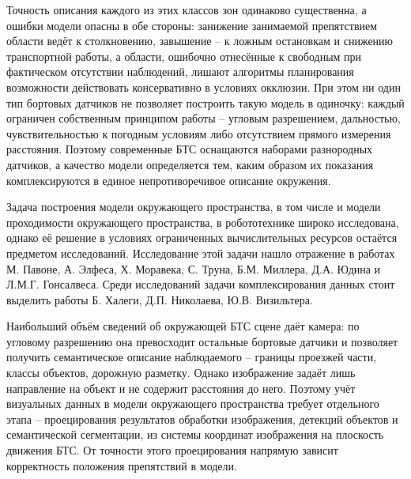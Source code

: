 Точность описания каждого из этих классов зон одинаково существенна, а ошибки модели опасны в обе стороны: занижение занимаемой препятствием области ведёт к столкновению, завышение -- к ложным остановкам и снижению транспортной работы, а области, ошибочно отнесённые к свободным при фактическом отсутствии наблюдений, лишают алгоритмы планирования возможности действовать консервативно в условиях окклюзии. При этом ни один тип бортовых датчиков не позволяет построить такую модель в одиночку: каждый ограничен собственным принципом работы -- угловым разрешением, дальностью, чувствительностью к погодным условиям либо отсутствием прямого измерения расстояния. Поэтому современные БТС оснащаются наборами разнородных датчиков, а качество модели определяется тем, каким образом их показания комплексируются в единое непротиворечивое описание окружения.

Задача построения модели окружающего пространства, в том числе и модели проходимости окружающего пространства, в робототехнике широко исследована, однако её решение в условиях ограниченных вычислительных ресурсов остаётся предметом исследований. Исследование этой задачи нашло отражение в работах М. Павоне, А. Элфеса, Х. Моравека, С. Труна, Б.М. Миллера, Д.А. Юдина и Л.М.Г. Гонсалвеса. Среди исследований задачи комплексирования данных стоит выделить работы Б. Халеги, Д.П. Николаева, Ю.В. Визильтера.

Наибольший объём сведений об окружающей БТС сцене даёт камера: по угловому разрешению она превосходит остальные бортовые датчики и позволяет получить семантическое описание наблюдаемого -- границы проезжей части, классы объектов, дорожную разметку. Однако изображение задаёт лишь направление на объект и не содержит расстояния до него. Поэтому учёт визуальных данных в модели окружающего пространства требует отдельного этапа -- проецирования результатов обработки изображения, детекций объектов и семантической сегментации, из системы координат изображения на плоскость движения БТС. От точности этого проецирования напрямую зависит корректность положения препятствий в модели.

